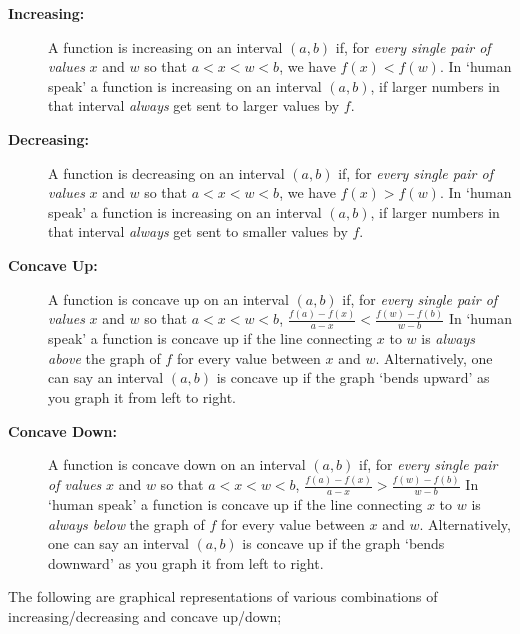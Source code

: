 \documentclass{ximeraXloud}
\begin{document}
\begin{description}
    \item[\textbf{Increasing:}] A function is increasing on an interval $(a,b)$ if, for \textit{every single pair of values} $x$ and $w$ so that  $a < x < w < b$, we have $f(x) < f(w)$. In `human speak' a function is increasing on an interval $(a,b)$, if larger numbers in that interval \textit{always} get sent to larger values by $f$.
    \item[\textbf{Decreasing:}] A function is decreasing on an interval $(a,b)$ if, for \textit{every single pair of values} $x$ and $w$ so that  $a < x < w < b$, we have $f(x) > f(w)$. In `human speak' a function is increasing on an interval $(a,b)$, if larger numbers in that interval \textit{always} get sent to smaller values by $f$.
    \item[\textbf{Concave Up:}] A function is concave up on an interval $(a,b)$ if, for \textit{every single pair of values} $x$ and $w$ so that  $a < x < w < b$, $\frac{f(a) - f(x)}{a-x} < \frac{f(w)-f(b)}{w-b}$ In `human speak' a function is concave up if the line connecting $x$ to $w$ is \textit{always above} the graph of $f$ for every value between $x$ and $w$. Alternatively, one can say an interval $(a,b)$ is concave up if the graph `bends upward' as you graph it from left to right.
    \item[\textbf{Concave Down:}] A function is concave down on an interval $(a,b)$ if, for \textit{every single pair of values} $x$ and $w$ so that  $a < x < w < b$, $\frac{f(a) - f(x)}{a-x} > \frac{f(w)-f(b)}{w-b}$ In `human speak' a function is concave up if the line connecting $x$ to $w$ is \textit{always below} the graph of $f$ for every value between $x$ and $w$. Alternatively, one can say an interval $(a,b)$ is concave up if the graph `bends downward' as you graph it from left to right.
\end{description}

The following are graphical representations of various combinations of increasing/decreasing and concave up/down;
\end{document}
